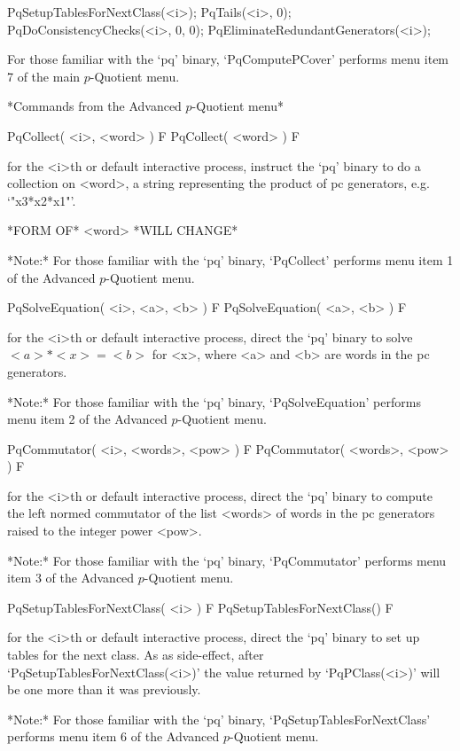PqSetupTablesForNextClass(<i>);
PqTails(<i>, 0);
PqDoConsistencyChecks(<i>, 0, 0);
PqEliminateRedundantGenerators(<i>);

For those familiar with the `pq' binary, `PqComputePCover' performs  menu
item 7 of the main $p$-Quotient menu.

*Commands from the Advanced $p$-Quotient menu*

\>PqCollect( <i>, <word> ) F
\>PqCollect( <word> ) F

for the <i>th or default interactive {\ANUPQ} process, instruct the  `pq'
binary to do a collection on <word>, a string representing the product of
pc generators, e.g. `"x3*x2*x1"'.

*FORM OF* <word> *WILL CHANGE*

*Note:* For those familiar with the  `pq'  binary,  `PqCollect'  performs
menu item 1 of the Advanced $p$-Quotient menu.

\>PqSolveEquation( <i>, <a>, <b> ) F
\>PqSolveEquation( <a>, <b> ) F

for the <i>th or default interactive {\ANUPQ} process,  direct  the  `pq'
binary to solve $<a> * <x> = <b>$ for <x>, where <a> and <b> are words in
the pc generators.

*Note:* 
For those familiar  with  the  `pq'  binary,  `PqSolveEquation'  performs
menu item 2 of the Advanced $p$-Quotient menu.

\>PqCommutator( <i>, <words>, <pow> ) F
\>PqCommutator( <words>, <pow> ) F

for the <i>th or default interactive {\ANUPQ} process, direct  the  `pq'
binary to compute the left normed commutator of the list <words> of words
in the pc generators raised to the integer power <pow>.

*Note:*
For those familiar with the `pq'  binary,  `PqCommutator'  performs  menu
item 3 of the Advanced $p$-Quotient menu.

\>PqSetupTablesForNextClass( <i> ) F
\>PqSetupTablesForNextClass() F

for the <i>th or default interactive {\ANUPQ} process,  direct  the  `pq'
binary  to  set  up  tables  for  the  next  class.  As  as  side-effect,
after   `PqSetupTablesForNextClass(<i>)'   the    value    returned    by
`PqPClass(<i>)' will be one more than it was previously.

*Note:* 
For those familiar  with  the  `pq'  binary,  `PqSetupTablesForNextClass'
performs menu item 6 of the Advanced $p$-Quotient menu.

